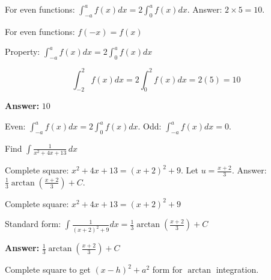 \begin{hint}
For even functions: $\int_{-a}^{a} f(x)dx = 2\int_0^a f(x)dx$. Answer: $2 \times 5 = 10$.
\end{hint}

\begin{solution}
For even functions: $f(-x) = f(x)$

Property: $\displaystyle \int_{-a}^a f(x)dx = 2\int_0^a f(x)dx$

\[
\int_{-2}^2 f(x)dx = 2\int_0^2 f(x)dx = 2(5) = 10
\]

\textbf{Answer:} $\boxed{10}$
\end{solution}

\begin{takeaways}
Even: $\int_{-a}^a f(x)dx = 2\int_0^a f(x)dx$. Odd: $\int_{-a}^a f(x)dx = 0$.
\end{takeaways}

\vspace{1cm}

\begin{problem}
Find $\displaystyle \int \frac{1}{x^2 + 4x + 13} \, dx$
\end{problem}

\begin{hint}
Complete square: $x^2 + 4x + 13 = (x+2)^2 + 9$. Let $u = \frac{x+2}{3}$. Answer: $\frac{1}{3}\arctan\left(\frac{x+2}{3}\right) + C$.
\end{hint}

\begin{solution}
Complete square: $x^2+4x+13 = (x+2)^2 + 9$

Standard form: $\displaystyle \int \frac{1}{(x+2)^2+9}dx = \frac{1}{3}\arctan\left(\frac{x+2}{3}\right) + C$

\textbf{Answer:} $\boxed{\frac{1}{3}\arctan\left(\frac{x+2}{3}\right) + C}$
\end{solution}

\begin{takeaways}
Complete square to get $(x-h)^2+a^2$ form for $\arctan$ integration.
\end{takeaways}
